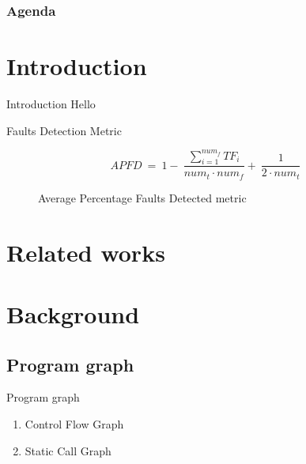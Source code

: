 \documentclass{beamer}
\title{\ThesisNameEN}
\subtitle{IMECS2017}
\date[2017.03.14]{\today}
\author{\authorNameEN~\small{and~\advisorEn}}
\institute{{\facultyEn}, {\universityEn}}
\begin{document}
\maketitle

\begin{frame}[t]
    \frametitle{Agenda}
    \tableofcontents[hideallsubsections]
\end{frame}

%
\section{Introduction}
\begin{frame}{Introduction}
  Hello
\end{frame}

\begin{frame}{Faults Detection Metric}
    \begin{figure}
        \begin{equation}
            APFD~=~1-~\frac{\sum^{num_f}_{i=1}{TF_i}}{{num}_t \cdot {num}_f} %
                    +~\frac{1}{2 \cdot {num}_t}
            \label{eq:apfd}
        \end{equation}
        \caption{Average Percentage Faults Detected metric \parencite{792604}}
        \label{fig:apfd}
    \end{figure}
\end{frame}

%
\section{Related works}

%
\section{Background}
\subsection{Program graph}
\begin{frame}{Program graph}
    \begin{enumerate}
        \item Control Flow Graph
        \item Static Call Graph
    \end{enumerate}
\end{frame}
\end{document}
